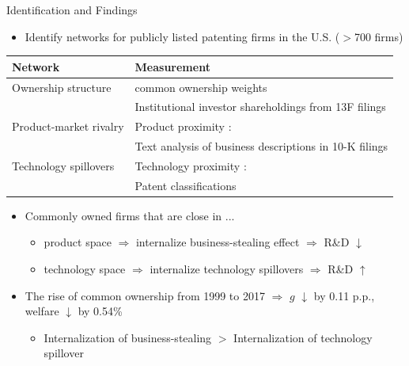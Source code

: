 \documentclass[
  10pt,
  aspectratio=169,   %
]{beamer}
\theoremstyle{plain}
\begin{document}
\begin{frame}{Identification and Findings}
  \begin{itemize}
    \item Identify networks for publicly listed patenting firms in the U.S. ($>$700 firms)
  \end{itemize}
  \begin{center}
    \begin{tabular}{l p{8.5cm}}
      \toprule
      Network                & Measurement                                              \\
      \midrule
      Ownership structure    & common ownership weights \citep{Backus2021-yt} \\ & Institutional investor shareholdings from 13F filings \\
      \addlinespace
      Product-market rivalry & Product proximity \citep{Hoberg2016-jm}:                 \\
                             & Text analysis of business descriptions in 10-K filings           \\
      \addlinespace
      Technology spillovers  & Technology proximity \citep{Jaffe1986-yz}:               \\
                             & Patent classifications                          \\
      \bottomrule
    \end{tabular}
  \end{center}
  \medskip{}\pause
  \begin{itemize}
    \item Commonly owned firms that are close in ...
          \begin{itemize}
            \item product space $\Longrightarrow$ internalize business-stealing effect $\Longrightarrow$ R\&D $\downarrow$
            \item technology space $\Longrightarrow$ internalize technology spillovers $\Longrightarrow$ R\&D $\uparrow$
          \end{itemize}
          \medskip{}\pause
    \item The rise of common ownership from 1999 to 2017 $\Longrightarrow$ $g$ $\downarrow$ by 0.11 p.p., welfare $\downarrow$ by 0.54\%
          \begin{itemize}
            \item \alert{Internalization of business-stealing $>$ Internalization of technology spillover}
          \end{itemize}
  \end{itemize}
\end{frame}
\end{document}
